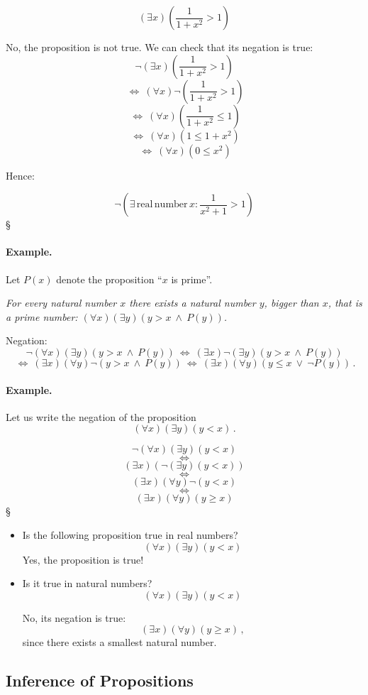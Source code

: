 \documentclass[11pt,paper=b5,footinclude,headinclude]{scrbook} %
\def\ali {{~\vee~}}
\def\inn {{~\wedge~}}
\def\cee {{~\Leftrightarrow~}}
\def\kz{{\hfill{\S}}}%
\theoremstyle{remark}
\theoremstyle{definition} %
\theoremstyle{theorem} %
\begin{document}
$$(\exists x) (\frac{1}{1+x^2} > 1)$$

No, the proposition is not true. We can check that its negation is true:
$$\neg (\exists x) (\frac{1}{1+x^2} > 1)$$
$$\cee (\forall x) \neg (\frac{1}{1+x^2} > 1)$$
$$\cee (\forall x) (\frac{1}{1+x^2} \le  1)$$
$$\cee (\forall x) (1 \le  1+x^2)$$
$$\cee (\forall x) (0 \le  x^2)$$

Hence:

$$
\neg  \left(
\exists \,\mathrm{ real \, number }\,x: \frac{1}{x^2+1}>1
\right)
$$\kz


\medskip
\paragraph{Example.}

Let $P(x)$ denote the proposition ``$x$ is prime''.

\emph{ For every natural number $x$ there exists a natural number $y$, bigger than $x$, that is a prime number:
  $(\forall x)(\exists y)(y>x\inn P(y))$.}

  Negation:   $$\neg (\forall x)(\exists y)(y>x\inn P(y)) \cee(\exists  x)\neg (\exists y)(y>x\inn P(y))$$
  $$\cee(\exists  x)(\forall  y)\neg (y>x\inn P(y))\cee(\exists  x)(\forall  y)(y\le x\ali \neg P(y))\,.$$


\bigskip
\bigskip
\paragraph{Example.}
Let us write the negation of the proposition
  $$(\forall x)(\exists y)(y<x)\,.$$

  $$\neg(\forall x)(\exists y)(y<x)$$
  $$\cee$$
  $$(\exists x)(\neg(\exists y)(y<x))$$
  $$\cee$$
  $$(\exists x)(\forall y)\neg(y<x)$$
  $$\cee$$
  $$(\exists x)(\forall y)(y\ge x)$$\kz

\begin{itemize}
  \item Is the following proposition true in real numbers?
  $$(\forall x)(\exists y)(y<x)$$
  Yes, the proposition is true!

  \item Is it true in natural numbers?
  $$(\forall x)(\exists y)(y<x)$$

No, its negation is true:
$$(\exists x)(\forall y)(y\ge x)\,,$$
since there exists a smallest natural number.
\end{itemize}
\subsection*{Inference of Propositions}
\end{document}
